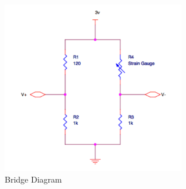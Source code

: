 \begin{figure}[H]
\begin{center}
\includegraphics[width=8cm]{implementation/figures/bridge_diagram}
\end{center}
\caption{Bridge Diagram}
\label{fig:Bridge Diagram}
\end{figure}
